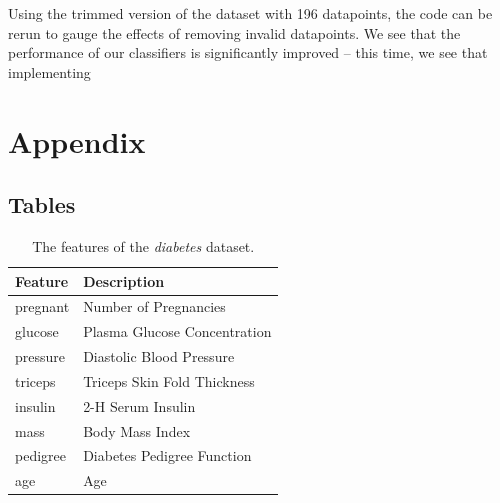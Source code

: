 \documentclass[twoside,twocolumn,10pt]{revtex4-1}
\begin{document}
	Using the trimmed version of the dataset with 196 datapoints, the code can be rerun to gauge the effects of removing invalid datapoints.  We see that the performance of our classifiers is significantly improved – this time, we see that implementing
	
	\section{Appendix}
	
	
	\subsection{Tables}
	
	\begin{table}[H]
	\center
		\begin{tabular}{l l}
		\textbf{Feature} & \textbf{Description} \\ 
		\hline
		pregnant & Number of Pregnancies\\
		glucose & Plasma Glucose Concentration\\
		pressure & Diastolic Blood Pressure\\
		triceps & Triceps Skin Fold Thickness\\
		insulin & 2-H Serum Insulin\\
		mass & Body Mass Index\\
		pedigree & Diabetes Pedigree Function\\
		age & Age
		\end{tabular}
		\caption{The features of the \textit{diabetes} dataset.\label{table_1}}
	\end{table}
	
\end{document}

